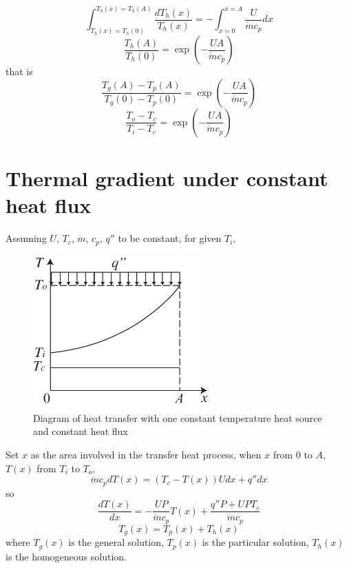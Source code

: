 \begin{equation}
\int_{T_{h}(x)=T_{h}(0)}^{T_{h}(x)=T_{h}(A)}\frac{dT_{h}(x)}{T_{h}(x)}=-\int_{x=0}^{x=A}\frac{U}{\dot{m}c_{p}}dx
\end{equation}
\begin{equation}
\frac{T_{h}(A)}{T_{h}(0)}=\exp(-\frac{UA}{\dot{m}c_{p}})
\end{equation}
that is
\begin{equation}
\frac{T_{g}(A)-T_{p}(A)}{T_{g}(0)-T_{p}(0)}=\exp(-\frac{UA}{\dot{m}c_{p}})
\end{equation}
\begin{equation}
\frac{T_{o}-T_{c}}{T_{i}-T_{c}}=\exp(-\frac{UA}{\dot{m}c_{p}})
\label{eq:Eq}
\end{equation}

\chapter{Thermal gradient under constant heat flux}\label{cha:CTCHFHX}

Assuming $U$, $T_{c}$, $\dot{m}$, $c_p$, $q''$ to be constant, for
given $T_{i}$,
\begin{figure}[h]
\centering
\includegraphics[width=0.6\textwidth]{fig/CTCHFHX.pdf}\caption{Diagram of heat transfer with one constant temperature
heat source and constant heat flux}
\label{fig:CTCHFHX}
\end{figure}

Set $x$ as the area involved in the transfer heat process, when $x$ from $0$ to $A$, $T(x)$ from $T_{i}$ to $T_{o}$,
\begin{equation}
\dot{m}c_{p}dT(x)=(T_{c}-T(x))Udx+q''dx
\end{equation}
so
\begin{equation}
\frac{dT(x)}{dx}=-\frac{UP}{\dot{m}c_{p}}T(x)+\frac{q''P+UPT_{c}}{\dot{m}c_{p}}
\end{equation}
\begin{equation}
T_{g}(x)=T_{p}(x)+T_{h}(x)
\end{equation}
where $T_{g}(x)$ is the general solution, $T_{p}(x)$ is the particular
solution, $T_{h}(x)$ is the homogeneous solution.

